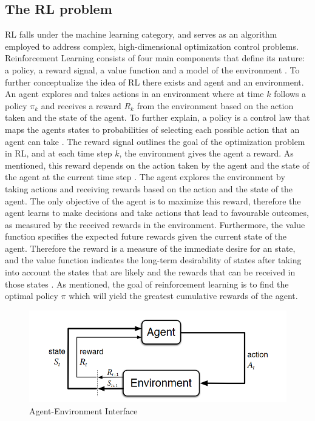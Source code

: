 \subsection{The RL problem}
RL falls under the machine learning category, and serves as an algorithm employed to address complex, high-dimensional optimization control problems. 
Reinforcement Learning consists of four main components that define its nature: a policy, a reward signal, a value function and a model of the environment \cite{suttonReinforcementLearningIntroduction2014}. To further conceptualize the idea of RL there exists and agent and an environment. An agent explores and takes actions in an environment where at time $k$ follows a policy $\pi_{k}$ and receives a reward $R_{k}$ from the environment based on the action taken and the state of the agent. To further explain, a policy is a control law that maps the agents states to probabilities of selecting each possible action that an agent can take \cite{suttonReinforcementLearningIntroduction2014}. The reward signal outlines the goal of the optimization problem in RL, and at each time step $k$, the environment gives the agent a reward. As mentioned, this reward depends on the action taken by the agent and the state of the agent at the current time step \cite{suttonReinforcementLearningIntroduction2014}.
The agent explores the environment by taking actions and receiving rewards based on the action and the state of the agent. The only objective of the agent is to maximize this reward, therefore the agent learns to make decisions and take actions that lead to favourable outcomes, as measured by the received rewards in the environment. Furthermore, the value function specifies the expected future rewards given the current state of the agent. Therefore the reward is a measure of the immediate desire for an state, and the value function indicates the long-term desirability of states after taking into account the states that are likely and the rewards that can be received in those states \cite{suttonReinforcementLearningIntroduction2014}. As mentioned, the goal of reinforcement learning is to find the optimal policy $\pi$ which will yield the greatest cumulative rewards of the agent.



\begin{figure}[h]
	\centering
	\includegraphics[width=0.75\linewidth]{figures/agent-environment.png}
	\caption{Agent-Environment Interface \cite{suttonReinforcementLearningIntroduction2014}}
	\label{fig:agent_environment}
\end{figure}

